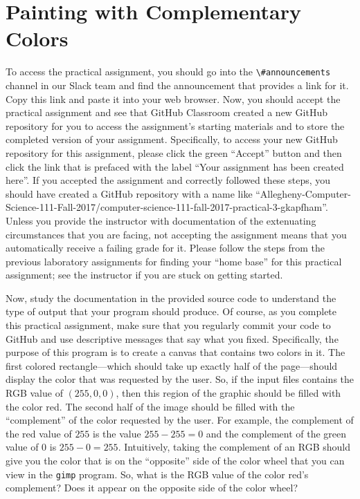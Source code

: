 \documentclass[11pt]{article}
\newcommand{\channel}[1]{\lstinline{#1}}
\begin{document}
\section*{Painting with Complementary Colors}

To access the practical assignment, you should go into the \channel{\#announcements} channel in our Slack team and find
the announcement that provides a link for it. Copy this link and paste it into your web browser. Now, you should accept
the practical assignment and see that GitHub Classroom created a new GitHub repository for you to access the
assignment's starting materials and to store the completed version of your assignment. Specifically, to access your new
GitHub repository for this assignment, please click the green ``Accept'' button and then click the link that is prefaced
with the label ``Your assignment has been created here''. If you accepted the assignment and correctly followed these
steps, you should have created a GitHub repository with a name like
``Allegheny-Computer-Science-111-Fall-2017/computer-science-111-fall-2017-practical-3-gkapfham''. Unless you provide the
instructor with documentation of the extenuating circumstances that you are facing, not accepting the assignment means
that you automatically receive a failing grade for it. Please follow the steps from the previous laboratory assignments
for finding your ``home base'' for this practical assignment; see the instructor if you are stuck on getting started.

Now, study the documentation in the provided source code to understand the type of output that your program should
produce. Of course, as you complete this practical assignment, make sure that you regularly commit your code to GitHub
and use descriptive messages that say what you fixed. Specifically, the purpose of this program is to create a canvas
that contains two colors in it. The first colored rectangle---which should take up exactly half of the page---should
display the color that was requested by the user. So, if the input files contains the RGB value of $(255,0,0)$, then
this region of the graphic should be filled with the color red. The second half of the image should be filled with the
``complement'' of the color requested by the user. For example, the complement of the red value of $255$ is the value
$255-255=0$ and the complement of the green value of $0$ is $255-0=255$. Intuitively, taking the complement of an RGB
should give you the color that is on the ``opposite'' side of the color wheel that you can view in the {\tt gimp}
program. So, what is the RGB value of the color red's complement? Does it appear on the opposite side of the color
wheel?
\end{document}
